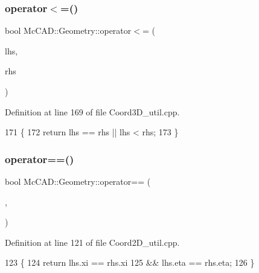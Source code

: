 \subsubsection{\texorpdfstring{operator$<$=()}{operator<=()}\hspace{0.1cm}{\footnotesize\ttfamily [3/3]}}
{\footnotesize\ttfamily bool Mc\+C\+A\+D\+::\+Geometry\+::operator$<$= (\begin{DoxyParamCaption}\item[{const \hyperlink{classMcCAD_1_1Geometry_1_1Coord3D}{Coord3D} \&}]{lhs,  }\item[{const \hyperlink{classMcCAD_1_1Geometry_1_1Coord3D}{Coord3D} \&}]{rhs }\end{DoxyParamCaption})}



Definition at line 169 of file Coord3\+D\+\_\+util.\+cpp.


\begin{DoxyCode}
171                            \{
172     \textcolor{keywordflow}{return} lhs == rhs || lhs < rhs;
173 \}
\end{DoxyCode}
\mbox{\label{namespaceMcCAD_1_1Geometry_a742210290c3e0feb0e768ffcd52ea18a}} 
\subsubsection{\texorpdfstring{operator==()}{operator==()}\hspace{0.1cm}{\footnotesize\ttfamily [1/3]}}
{\footnotesize\ttfamily bool Mc\+C\+A\+D\+::\+Geometry\+::operator== (\begin{DoxyParamCaption}\item[{const \hyperlink{classMcCAD_1_1Geometry_1_1Coord2D}{Coord2D} \&}]{,  }\item[{const \hyperlink{classMcCAD_1_1Geometry_1_1Coord2D}{Coord2D} \&}]{ }\end{DoxyParamCaption})}



Definition at line 121 of file Coord2\+D\+\_\+util.\+cpp.


\begin{DoxyCode}
123                            \{
124     \textcolor{keywordflow}{return} lhs.xi == rhs.xi
125             && lhs.eta == rhs.eta;
126 \}
\end{DoxyCode}
\mbox{\label{namespaceMcCAD_1_1Geometry_a003989b55df0450a39e806be1c569fdc}} 
